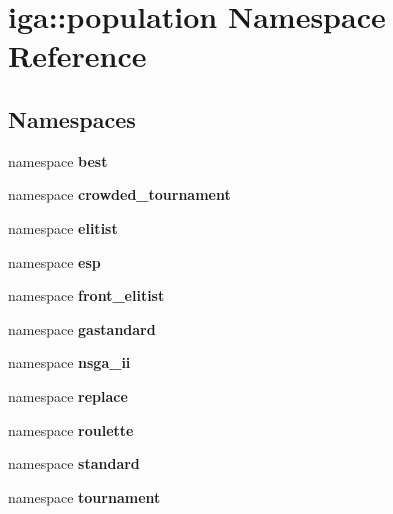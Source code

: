 \section{iga::population Namespace Reference}
\label{namespaceiga_1_1population}


\subsection*{Namespaces}
\begin{CompactItemize}
\item 
namespace {\bf best}
\item 
namespace {\bf crowded\_\-tournament}
\item 
namespace {\bf elitist}
\item 
namespace {\bf esp}
\item 
namespace {\bf front\_\-elitist}
\item 
namespace {\bf gastandard}
\item 
namespace {\bf nsga\_\-ii}
\item 
namespace {\bf replace}
\item 
namespace {\bf roulette}
\item 
namespace {\bf standard}
\item 
namespace {\bf tournament}
\end{CompactItemize}
